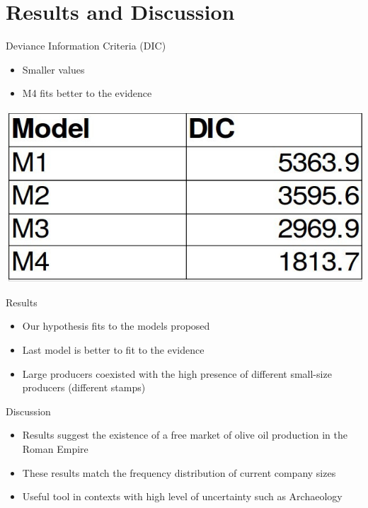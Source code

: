 \documentclass[12pt, handout=show,notes=show]{beamer}
\begin{document}
\section{Results and Discussion}

\begin{frame}{Deviance Information Criteria (DIC)}
\begin{itemize}
\item Smaller values 
\item M4 fits better to the evidence
\end{itemize}
\begin{center}
		\includegraphics[height=0.3\textwidth]{./dictable.jpg}
		\vfill
	
\end{center}	
			
\end{frame}


\begin{frame}{Results}
\begin{itemize}
\item Our hypothesis fits to the models proposed
\item Last model is better to fit to the evidence
\item Large producers coexisted with the high presence of different small-size producers (different stamps)

\end{itemize}
\end{frame} 

\begin{frame}{Discussion}
\begin{itemize}
\item Results suggest the existence of a free market of olive oil production in the Roman Empire 
\item These results match the frequency distribution of current company sizes
\item Useful tool in contexts with high level of uncertainty such as Archaeology

\end{itemize}
\end{frame} 
\end{document}
